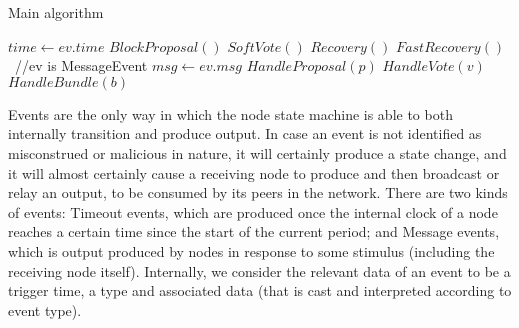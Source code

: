 \documentclass[10pt,a4paper]{article}
\begin{document}
\begin{section}{Main algorithm}


\begin{algorithm}[H]
    \begin{algorithmic}[1]
    
        \State $time \gets ev.time$
            \State $BlockProposal()$
            \State $SoftVote()$
            \State $Recovery()$
            \State $FastRecovery()$
        \EndIf
    \Else \ //ev is MessageEvent
        \State $msg \gets ev.msg$
            \State $HandleProposal(p)$
            \State $HandleVote(v)$
            \State $HandleBundle(b)$
        \EndIf
    \EndIf

    \EndFunction
    \end{algorithmic}
    \caption{\underline{Main node algorithm}}
\end{algorithm}

Events are the only way in which the node state machine is able to both internally transition and produce output.
In case an event is not identified as misconstrued or malicious in nature, it will certainly produce a state change,
and it will almost certainly cause a receiving node to produce and then broadcast or relay an output, to be consumed
by its peers in the network.
There are two kinds of events: Timeout events, which are produced once the internal clock of a node reaches a certain
time since the start of the current period; and Message events, which is output produced by nodes in response to some stimulus
(including the receiving node itself).
Internally, we consider the relevant data of an event to be a trigger time, a type and associated data (that is cast 
and interpreted according to event type).





\end{section}
\end{document}
